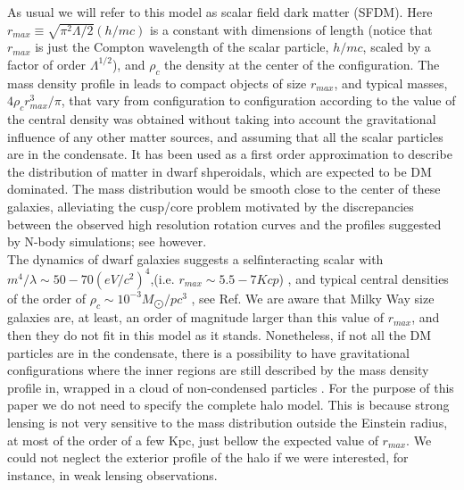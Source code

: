 \documentclass[%
 twocolumn,
 amsmath,amssymb,
 aps,
]{revtex4-2}
\begin{document}
As usual we will refer to this model as scalar field dark
matter (SFDM). Here $r_{max}\equiv \sqrt{\pi ^{2}\Lambda /2}(h/mc)$ is a constant with dimensions of length (notice that $r_{max}$ is just the Compton wavelength of the scalar particle, $h/mc$, scaled by a factor of order $\Lambda^{1/2}$), and $\rho_c$ the density at
the center of the configuration. The mass density profile
in  leads to compact objects of size $r_{max}$, and typical masses, $4\rho_{c}r_{max}^{3}/\pi$, that vary from configuration to
configuration according to the value of the central density  was obtained without taking into account the gravitational influence of any other matter sources, and assuming that all the scalar particles are in the condensate. It has been used as a first order approximation to describe the distribution of matter in dwarf shperoidals, which are expected to be DM dominated. The mass distribution would be smooth close to the center of these
galaxies, alleviating the cusp/core problem motivated by
the discrepancies between the observed high resolution
rotation curves and the profiles suggested by N-body simulations; see however.\\
The dynamics of dwarf galaxies suggests a selfinteracting scalar with$m^{4}/\lambda \sim 50-70(eV/c^{2})^{4}$,(i.e. $r_{max}\sim 5.5-7Kcp$) , and typical central densities of the
order of $ρ_{c} \sim 10^{-3} M_{\bigodot}/pc^{3}$
, see Ref. We are aware that Milky Way size galaxies are, at least, an order of
magnitude larger than this value of $r_{max}$, and then they
do not fit in this model as it stands. Nonetheless, if
not all the DM particles are in the condensate, there is
a possibility to have gravitational configurations where
the inner regions are still described by the mass density
profile in, wrapped in a cloud of non-condensed
particles . For the purpose of this paper we do not
need to specify the complete halo model. This is because
strong lensing is not very sensitive to the mass distribution outside the Einstein radius, at most of the order of
a few Kpc, just bellow the expected value of $r_{max}$. We
could not neglect the exterior profile of the halo if we were
interested, for instance, in weak lensing observations.
\end{document}

